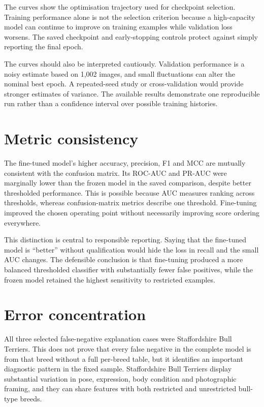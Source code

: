 The curves show the optimisation trajectory used for checkpoint selection. Training performance alone is not the selection criterion because a high-capacity model can continue to improve on training examples while validation loss worsens. The saved checkpoint and early-stopping controls protect against simply reporting the final epoch.

The curves should also be interpreted cautiously. Validation performance is a noisy estimate based on 1,002 images, and small fluctuations can alter the nominal best epoch. A repeated-seed study or cross-validation would provide stronger estimates of variance. The available results demonstrate one reproducible run rather than a confidence interval over possible training histories.

\section{Metric consistency}
The fine-tuned model's higher accuracy, precision, F1 and MCC are mutually consistent with the confusion matrix. Its ROC-AUC and PR-AUC were marginally lower than the frozen model in the saved comparison, despite better thresholded performance. This is possible because AUC measures ranking across thresholds, whereas confusion-matrix metrics describe one threshold. Fine-tuning improved the chosen operating point without necessarily improving score ordering everywhere.

This distinction is central to responsible reporting. Saying that the fine-tuned model is ``better'' without qualification would hide the loss in recall and the small AUC changes. The defensible conclusion is that fine-tuning produced a more balanced thresholded classifier with substantially fewer false positives, while the frozen model retained the highest sensitivity to restricted examples.

\section{Error concentration}
All three selected false-negative explanation cases were Staffordshire Bull Terriers. This does not prove that every false negative in the complete model is from that breed without a full per-breed table, but it identifies an important diagnostic pattern in the fixed sample. Staffordshire Bull Terriers display substantial variation in pose, expression, body condition and photographic framing, and they can share features with both restricted and unrestricted bull-type breeds.

